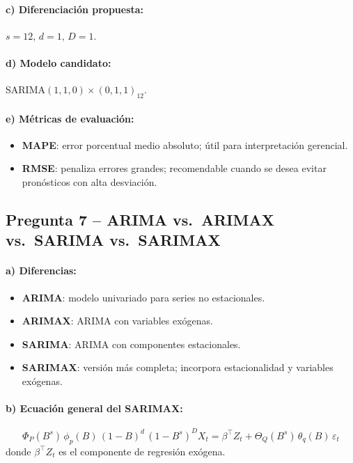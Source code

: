 \documentclass[12pt, a4paper]{article}
\begin{document}
\paragraph{c) Diferenciación propuesta:}
$s=12$, $d=1$, $D=1$.

\paragraph{d) Modelo candidato:}
SARIMA$(1,1,0)\times(0,1,1)_{12}$.

\paragraph{e) Métricas de evaluación:}
\begin{itemize}
  \item \textbf{MAPE}: error porcentual medio absoluto; útil para interpretación
        gerencial.
  \item \textbf{RMSE}: penaliza errores grandes; recomendable cuando se desea
        evitar pronósticos con alta desviación.
\end{itemize}

\subsection{Pregunta 7 -- ARIMA vs.\ ARIMAX vs.\ SARIMA vs.\ SARIMAX}

\paragraph{a) Diferencias:}
\begin{itemize}
  \item \textbf{ARIMA}: modelo univariado para series no estacionales.
  \item \textbf{ARIMAX}: ARIMA con variables exógenas.
  \item \textbf{SARIMA}: ARIMA con componentes estacionales.
  \item \textbf{SARIMAX}: versión más completa; incorpora estacionalidad y
        variables exógenas.
\end{itemize}

\paragraph{b) Ecuación general del SARIMAX:}
\[
  \Phi_P(B^s)\,\phi_p(B)\,(1-B)^d\,(1-B^s)^D X_t
  = \beta^\top Z_t + \Theta_Q(B^s)\,\theta_q(B)\,\varepsilon_t
\]
donde $\beta^\top Z_t$ es el componente de regresión exógena.
\end{document}
